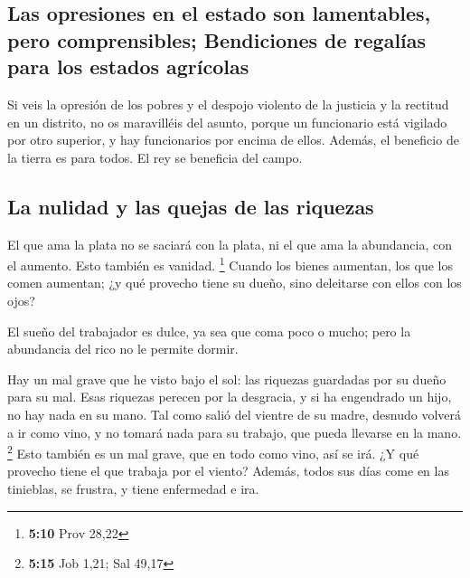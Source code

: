 \begin{paracol}{2}
\hypertarget{las-opresiones-en-el-estado-son-lamentables-pero-comprensibles-bendiciones-de-regaluxedas-para-los-estados-agruxedcolas}{%
\subsection{Las opresiones en el estado son lamentables, pero
comprensibles; Bendiciones de regalías para los estados
agrícolas}\label{las-opresiones-en-el-estado-son-lamentables-pero-comprensibles-bendiciones-de-regaluxedas-para-los-estados-agruxedcolas}}

 Si veis la opresión de los pobres y el despojo violento
de la justicia y la rectitud en un distrito, no os maravilléis del
asunto, porque un funcionario está vigilado por otro superior, y hay
funcionarios por encima de ellos.  Además, el beneficio de
la tierra es para todos. El rey se beneficia del campo.

\hypertarget{la-nulidad-y-las-quejas-de-las-riquezas}{%
\subsection{La nulidad y las quejas de las
riquezas}\label{la-nulidad-y-las-quejas-de-las-riquezas}}

 El que ama la plata no se saciará con la plata, ni el
que ama la abundancia, con el aumento. Esto también es vanidad.
\footnote{\textbf{5:10} Prov 28,22}  Cuando los bienes
aumentan, los que los comen aumentan; ¿y qué provecho tiene su dueño,
sino deleitarse con ellos con los ojos?

 El sueño del trabajador es dulce, ya sea que coma poco o
mucho; pero la abundancia del rico no le permite dormir.

 Hay un mal grave que he visto bajo el sol: las riquezas
guardadas por su dueño para su mal.  Esas riquezas
perecen por la desgracia, y si ha engendrado un hijo, no hay nada en su
mano.  Tal como salió del vientre de su madre, desnudo
volverá a ir como vino, y no tomará nada para su trabajo, que pueda
llevarse en la mano. \footnote{\textbf{5:15} Job 1,21; Sal 49,17}
 Esto también es un mal grave, que en todo como vino, así
se irá. ¿Y qué provecho tiene el que trabaja por el viento?
 Además, todos sus días come en las tinieblas, se
frustra, y tiene enfermedad e ira.

\hypertarget{recomendaciuxf3n-del-disfrute-de-la-vida-ademuxe1s-del-trabajo-y-la-riqueza}{%
}
\end{paracol}
